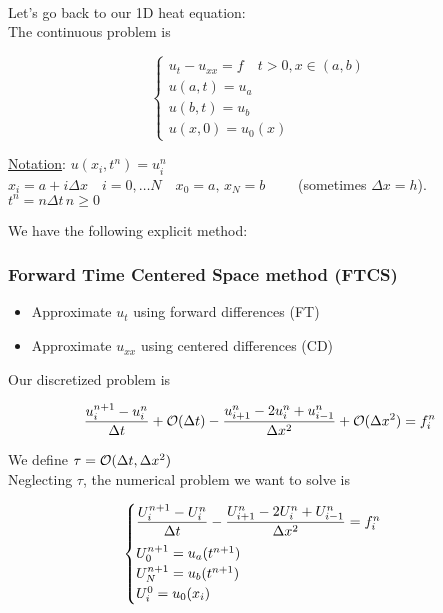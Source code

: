 \-\\

Let's go back to our 1D heat equation: \\

The continuous problem is 

\[
\begin{cases}
  u_t - u_{xx} = f \quad t>0, x\in(a,b)\\
  u(a,t) = u_a\\
  u(b,t) = u_b \\
  u(x,0) = u_0(x)
\end{cases}
\]

\underline{Notation}: $u(x_i,t^n) = u_i^n$ \\
$x_i = a + i\Delta x \quad i = 0,\ldots N \quad x_0 = a,\, x_N = b \qquad$ (sometimes $\Delta x = h$).\\
$t^n = n\Delta t \, n\geq0$\\

\newpage

We have the following explicit method:

\subsubsection{Forward Time Centered Space method (FTCS)}

\begin{itemize}
    \item Approximate $u_t$ using forward differences (FT)
    \item Approximate $u_{xx}$ using centered differences (CD)
\end{itemize}

Our discretized problem is

\[
  \frac{u_i^{n+1} - u_i^n}{\Delta t} + \mathcal{O}(\Delta t) - \frac{u_{i+1}^n - 2u_i^n + u_{i-1}^n}{\Delta x^2} + \mathcal{O}(\Delta x^2) = f_i^n
\]

We define $\tau = \mathcal{O}(\Delta t,\Delta x^2)$ \\

Neglecting $\tau$, the numerical problem we want to solve is

\[
  \begin{cases}
    \dfrac{U_i^{n+1} - U_i^n}{\Delta t} - \dfrac{U_{i+1}^n - 2U_i^n + U_{i-1}^n}{\Delta x^2} = f_i^n \vspace{0.2cm}\\
    U_0^{n+1} = u_a(t^{n+1})\\
    U_N^{n+1} = u_b(t^{n+1}) \\
    U_i^0 = u_0(x_i)
  \end{cases}
\]

